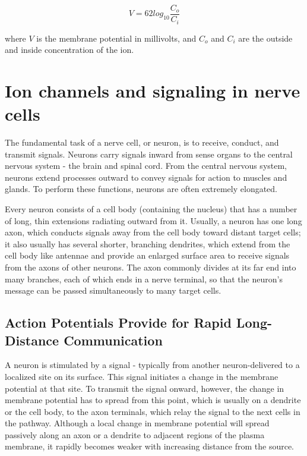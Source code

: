 \begin{equation}
V = 62 log_{10} \frac{C_{o}}{C_{i}}
\end{equation}

where $V$ is the membrane potential in millivolts, and $C_o$ and $C_i$ are the outside and inside concentration
of the ion.

\section{Ion channels and signaling in nerve cells}

The fundamental task of a nerve cell, or neuron, is to receive, conduct,
and transmit signals. Neurons carry signals inward from sense organs
to the central nervous system - the brain and spinal cord.
From the central nervous system, neurons extend processes outward to
convey signals for action to muscles and glands. To perform these functions,
neurons are often extremely elongated.

Every neuron consists of a cell body (containing the nucleus) that has a
number of long, thin extensions radiating outward from it. Usually, a neuron
has one long axon, which conducts signals away from the cell body
toward distant target cells; it also usually has several shorter, branching
dendrites, which extend from the cell body like antennae and provide an
enlarged surface area to receive signals from the axons of other neurons.
The axon commonly divides at its far end into many
branches, each of which ends in a nerve terminal, so that the neuron’s
message can be passed simultaneously to many target cells.

\subsection{Action Potentials Provide for Rapid Long-Distance Communication}

A neuron is stimulated by a signal - typically from another neuron-delivered
to a localized site on its surface. This signal initiates a change in
the membrane potential at that site. To transmit the signal onward, however,
the change in membrane potential has to spread from this point,
which is usually on a dendrite or the cell body, to the axon terminals,
which relay the signal to the next cells in the pathway. Although a local
change in membrane potential will spread passively along an axon or a
dendrite to adjacent regions of the plasma membrane, it rapidly becomes
weaker with increasing distance from the source.

